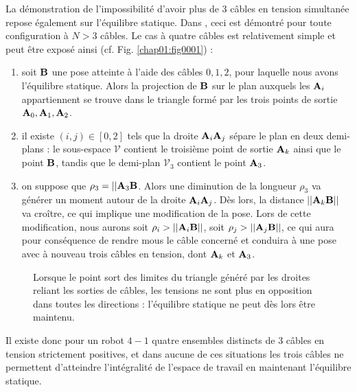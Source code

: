 La démonstration de l'impossibilité d'avoir plus de $3$ câbles en tension 
simultanée repose également sur l'équilibre statique. Dans \cite{merlet2012}, 
ceci est démontré pour toute configuration à $N > 3$ câbles. Le cas à quatre 
câbles est relativement simple et peut être exposé ainsi (cf. 
Fig. \ref{chap01:fig0001}) :
\begin{enumerate}
 \item soit ${\bf B}$ une pose atteinte \`a l'aide des c\^ables $0,1,2$, pour 
laquelle nous avons l'\'equilibre statique. Alors la projection de ${\bf B}$ 
sur le plan auxquels les ${\bf A}_i$ appartiennent se trouve dans le triangle 
form\'e par les trois points de sortie ${\bf A}_0, {\bf A}_1, {\bf A}_2$.
\item il existe $(i,j) \in [0,2]$ tels que la droite ${\bf A}_i{\bf A}_j$ 
s\'epare le plan en deux demi-plans : le sous-espace $\mathcal V$ contient le 
troisi\`eme point de sortie ${\bf A}_k$ ainsi que le point ${\bf B}$, tandis 
que le demi-plan $\mathcal V_3$ contient le point ${\bf A}_3$.
\item on suppose que $\rho_3 = ||{\bf A}_3{\bf B}$. Alors une diminution de la 
longueur $\rho_3$ va g\'en\'erer un moment autour de la droite ${\bf A}_i{\bf 
A}_j$. D\`es lors, la distance $||{\bf A}_k{\bf B}||$ va cro\^itre, ce qui 
implique une modification de la pose. Lors de cette modification, nous aurons 
soit $\rho_i > ||{\bf A}_i{\bf B}||$, soit $\rho_j > ||{\bf A}_j{\bf B}||$, ce 
qui aura pour cons\'equence de rendre mous le c\^able concern\'e et conduira 
\`a une pose avec \`a nouveau trois c\^ables en tension, dont ${\bf A}_k$ et 
${\bf A}_3$.
\end{enumerate}

\begin{figure}[!ht]
  \centering
    \def\svgwidth{.65\linewidth}
  
    \caption{\footnotesize{Lorsque le point sort des limites du triangle généré 
par les droites reliant les sorties de câbles, les tensions ne sont plus en 
opposition dans toutes les directions : l'équilibre statique ne peut dès lors 
être maintenu.}}
\label{chap01:fig0000}
\end{figure}

Il existe donc pour un robot $4-1$ quatre ensembles distincts de 3 câbles en 
tension strictement positives, et dans aucune de ces situations les trois 
câbles ne permettent d'atteindre l'intégralité de l'espace de travail en 
maintenant l'équilibre statique.

